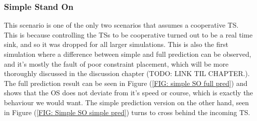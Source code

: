 \subsubsection{Simple Stand On}
This scenario is one of the only two scenarios that assumes a cooperative TS. This is because controlling the TSs to be cooperative
turned out to be a real time sink, and so it was dropped for all larger simulations. 
This is also the first simulation where a difference between simple and full
prediction can be observed, and it's mostly the fault of poor constraint placement, which will be more thoroughly 
discussed in the discussion chapter (TODO: LINK TIL CHAPTER.). The full prediction result can be seen in
Figure (\ref{FIG: simple SO full pred}) and shows that the OS does not deviate from it's speed or course, which is exactly the behaviour we would want. 
The simple prediction version on the other hand, seen in Figure (\ref{FIG: Simple SO simple pred}) turns to cross behind the incoming TS.

